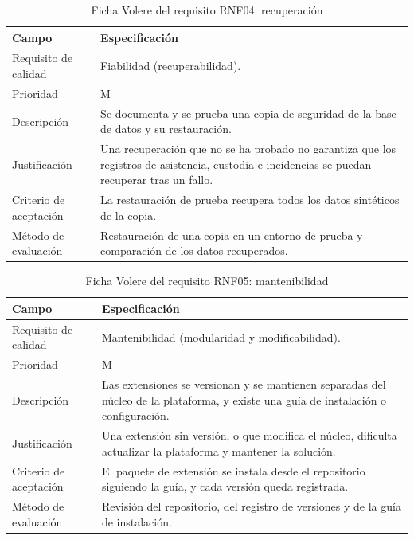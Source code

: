 \begin{table}[H]
\centering\small
\begin{tabularx}{\textwidth}{>{\hsize=0.385\hsize\raggedright\arraybackslash}X>{\hsize=1.615\hsize\raggedright\arraybackslash}X}
\toprule
\rowcolor{cabeceratabla} \textbf{Campo} & \textbf{Especificación} \\
\midrule
Requisito de calidad & Fiabilidad (recuperabilidad). \\
Prioridad & M \\
Descripción & Se documenta y se prueba una copia de seguridad de la base de datos y su restauración. \\
Justificación & Una recuperación que no se ha probado no garantiza que los registros de asistencia, custodia e incidencias se puedan recuperar tras un fallo. \\
Criterio de aceptación & La restauración de prueba recupera todos los datos sintéticos de la copia. \\
Método de evaluación & Restauración de una copia en un entorno de prueba y comparación de los datos recuperados. \\
\bottomrule
\end{tabularx}
\caption{Ficha Volere del requisito RNF04: recuperación}\label{tab:rnf04}
\end{table}

\begin{table}[H]
\centering\small
\begin{tabularx}{\textwidth}{>{\hsize=0.385\hsize\raggedright\arraybackslash}X>{\hsize=1.615\hsize\raggedright\arraybackslash}X}
\toprule
\rowcolor{cabeceratabla} \textbf{Campo} & \textbf{Especificación} \\
\midrule
Requisito de calidad & Mantenibilidad (modularidad y modificabilidad). \\
Prioridad & M \\
Descripción & Las extensiones se versionan y se mantienen separadas del núcleo de la plataforma, y existe una guía de instalación o configuración. \\
Justificación & Una extensión sin versión, o que modifica el núcleo, dificulta actualizar la plataforma y mantener la solución. \\
Criterio de aceptación & El paquete de extensión se instala desde el repositorio siguiendo la guía, y cada versión queda registrada. \\
Método de evaluación & Revisión del repositorio, del registro de versiones y de la guía de instalación. \\
\bottomrule
\end{tabularx}
\caption{Ficha Volere del requisito RNF05: mantenibilidad}\label{tab:rnf05}
\end{table}

